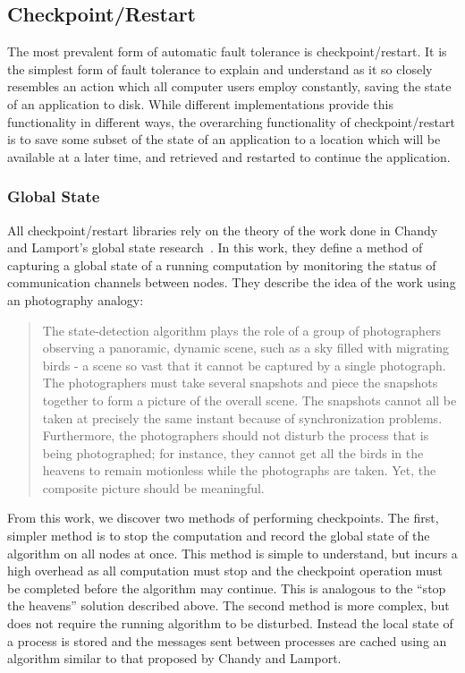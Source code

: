 \subsection{Checkpoint/Restart}
\label{subsec:background:types:auto}

The most prevalent form of automatic fault tolerance is checkpoint/restart. 
It is the simplest form of fault tolerance to explain and understand as 
it so closely resembles an action which all computer users employ constantly, 
saving the state of an application to disk. While different implementations 
provide this functionality in different ways, the overarching functionality of 
checkpoint/restart is to save some subset of the state of an application to a location 
which will be available at a later time, and retrieved and restarted to continue the 
application.

\subsubsection{Global State}

All checkpoint/restart libraries rely on the theory of the work done in Chandy and Lamport's global state research~\cite{Chandy85}. In this work, they define a method of capturing a global state of a running computation by monitoring the status of communication channels between nodes. They describe the idea of the work using an photography analogy:

\begin{quotation}
The state-detection algorithm plays the role of a group of photographers observing a 
panoramic, dynamic scene, such as a sky filled with migrating birds - a scene so vast 
that it cannot be captured by a single photograph. The photographers must take several 
snapshots and piece the snapshots together to form a picture of the overall scene. The 
snapshots cannot all be taken at precisely the same instant because of synchronization 
problems. Furthermore, the photographers should not disturb the process that is being 
photographed; for instance, they cannot get all the birds in the heavens to remain 
motionless while the photographs are taken. Yet, the composite picture should be 
meaningful.
\end{quotation}

From this work, we discover two methods of performing checkpoints. The first, simpler 
method is to stop the computation and record the global state of the algorithm on all 
nodes at once. This method is simple to understand, but incurs a high overhead as all 
computation must stop and the checkpoint operation must be completed before the 
algorithm may continue. This is analogous to the ``stop the heavens'' solution 
described above. The second method is more complex, but does not require the 
running algorithm to be disturbed. Instead the local state of a process is stored and 
the messages sent between processes are cached using an algorithm similar to that 
proposed by Chandy and Lamport.

